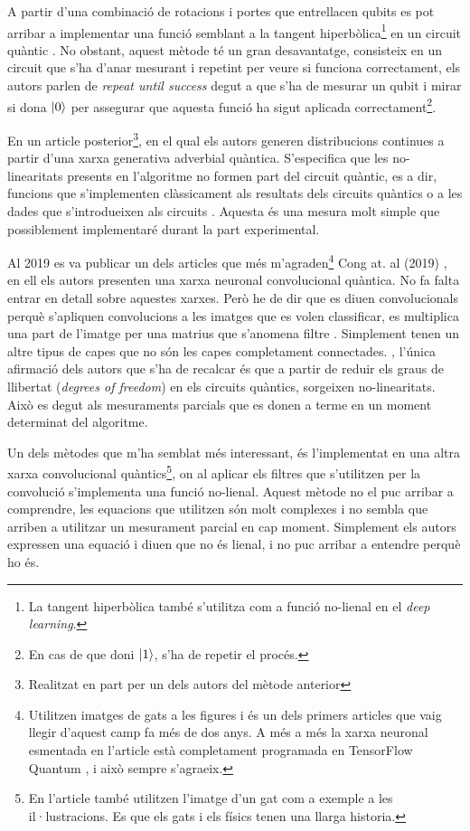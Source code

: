 A partir d'una combinació de rotacions i portes que entrellacen qubits es pot arribar a implementar una funció semblant a la tangent hiperbòlica\footnote{La tangent hiperbòlica també s'utilitza com a funció no-lienal en el \textit{deep learning}.} en un circuit quàntic \cite{cao2017quantum}. No obstant, aquest mètode té un gran desavantatge, consisteix en un circuit que s'ha d'anar mesurant i repetint per veure si funciona correctament, els autors parlen de \textit{repeat until success} degut a que s'ha de mesurar un qubit i mirar si dona $\ket{0}$ per assegurar que aquesta funció ha sigut aplicada correctament\footnote{En cas de que doni $\ket{1}$, s'ha de repetir el procés.}. 

En un article posterior\footnote{Realitzat en part per un dels autors del mètode anterior}, en el qual els autors generen distribucions continues a partir d'una xarxa generativa adverbial quàntica.
S'especifica que les no-linearitats presents en l'algoritme no formen part del circuit quàntic, es a dir, funcions que s'implementen clàssicament als resultats dels circuits quàntics o a les dades que s'introdueixen als circuits \cite{romero2019variational}. Aquesta és una mesura molt simple que possiblement implementaré durant la part experimental. 

Al 2019 es va publicar un dels articles que més m'agraden\footnote{Utilitzen imatges de gats a les figures i és un dels primers articles que vaig llegir d'aquest camp fa més de dos anys. A més a més la xarxa neuronal esmentada en l'article està completament programada en TensorFlow Quantum \cite{tfq}, i això sempre s'agraeix. } Cong at. al (2019) \cite{cong2019convolucional}, en ell els autors presenten una xarxa neuronal convolucional quàntica. No fa falta entrar en detall sobre aquestes xarxes. Però he de dir que es diuen convolucionals perquè s'apliquen convolucions a les imatges que es volen classificar, es multiplica una part de l'imatge per una matrius que s'anomena filtre \cite{CNN}. Simplement tenen un altre tipus de capes que no són les capes completament connectades. , l'única afirmació dels autors que s'ha de recalcar és que a partir de reduir els graus de llibertat (\textit{degrees of freedom}) en els circuits quàntics, sorgeixen no-linearitats. Això es degut als mesuraments parcials que es donen a terme en un moment determinat del algoritme. 

Un dels mètodes que m'ha semblat més interessant, és l'implementat en una altra xarxa convolucional quàntics\footnote{En l'article també utilitzen l'imatge d'un gat com a exemple a les il·lustracions. Es que els gats i els físics tenen una llarga historia. }, on al aplicar els filtres que s'utilitzen per la convolució s'implementa una funció no-lienal. Aquest mètode no el puc arribar a comprendre, les equacions que utilitzen són molt complexes i no sembla que arriben a utilitzar un mesurament parcial en cap moment. Simplement els autors expressen una equació i diuen que no és lienal, i no puc arribar a entendre perquè ho és. 

